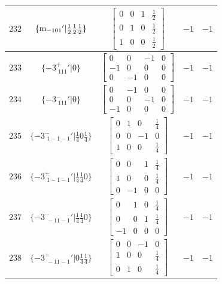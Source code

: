 \documentclass[fleqn,8pt]{jsarticle}
\begin{document}
\begin{longtable}{ccccc}
$ 232 $ & $ \{{\rm m}_{-101}{}'|\frac{1}{2} \frac{1}{2} \frac{1}{2}\} $ & $ \begin{bmatrix} 0 & 0 & 1 & \frac{1}{2} \\ 0 & 1 & 0 & \frac{1}{2} \\ 1 & 0 & 0 & \frac{1}{2} \end{bmatrix} $ & $ -1 $ & $ -1 $ \\ \hline
$ 233 $ & $ \{-3^{+}_{\,\,111}{}'|0\} $ & $ \begin{bmatrix} 0 & 0 & -1 & 0 \\ -1 & 0 & 0 & 0 \\ 0 & -1 & 0 & 0 \end{bmatrix} $ & $ -1 $ & $ -1 $ \\ \hline
$ 234 $ & $ \{-3^{-}_{\,\,111}{}'|0\} $ & $ \begin{bmatrix} 0 & -1 & 0 & 0 \\ 0 & 0 & -1 & 0 \\ -1 & 0 & 0 & 0 \end{bmatrix} $ & $ -1 $ & $ -1 $ \\ \hline
$ 235 $ & $ \{-3^{-}_{\,\,1-1-1}{}'|\frac{1}{4} 0 \frac{1}{4}\} $ & $ \begin{bmatrix} 0 & 1 & 0 & \frac{1}{4} \\ 0 & 0 & -1 & 0 \\ 1 & 0 & 0 & \frac{1}{4} \end{bmatrix} $ & $ -1 $ & $ -1 $ \\ \hline
$ 236 $ & $ \{-3^{+}_{\,\,1-1-1}{}'|\frac{1}{4} \frac{1}{4} 0\} $ & $ \begin{bmatrix} 0 & 0 & 1 & \frac{1}{4} \\ 1 & 0 & 0 & \frac{1}{4} \\ 0 & -1 & 0 & 0 \end{bmatrix} $ & $ -1 $ & $ -1 $ \\ \hline
$ 237 $ & $ \{-3^{-}_{\,\,-11-1}{}'|\frac{1}{4} \frac{1}{4} 0\} $ & $ \begin{bmatrix} 0 & 1 & 0 & \frac{1}{4} \\ 0 & 0 & 1 & \frac{1}{4} \\ -1 & 0 & 0 & 0 \end{bmatrix} $ & $ -1 $ & $ -1 $ \\ \hline
$ 238 $ & $ \{-3^{+}_{\,\,-11-1}{}'|0 \frac{1}{4} \frac{1}{4}\} $ & $ \begin{bmatrix} 0 & 0 & -1 & 0 \\ 1 & 0 & 0 & \frac{1}{4} \\ 0 & 1 & 0 & \frac{1}{4} \end{bmatrix} $ & $ -1 $ & $ -1 $ \\ \hline

\end{longtable}
\end{document}
